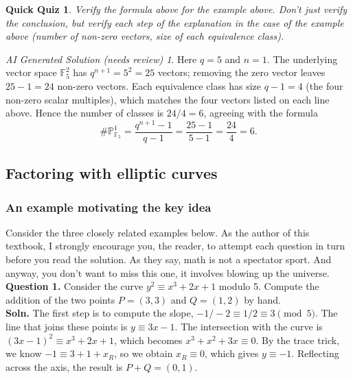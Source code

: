 \documentclass{article}
\theoremstyle{plain}
\newtheorem{quiz}[theorem]{Quick Quiz}
\theoremstyle{definition}
\theoremstyle{remark}
\newtheorem*{aisolution}{AI Generated Solution (needs review)}
\numberwithin{theorem}{section}
\newcommand{\FF}{\mathbb{F}}
\newcommand{\PP}{\mathbb{P}}
\begin{document}
\begin{quiz}
    Verify the formula above for the example above.  Don't just verify the conclusion, but verify each step of the explanation in the case of the example above (number of non-zero vectors, size of each equivalence class).
\end{quiz}
\begin{aisolution}
Here $q = 5$ and $n = 1$.  The underlying vector space $\FF_5^2$ has $q^{n+1} = 5^2 = 25$ vectors; removing the zero vector leaves $25 - 1 = 24$ non-zero vectors.  Each equivalence class has size $q - 1 = 4$ (the four non-zero scalar multiples), which matches the four vectors listed on each line above.  Hence the number of classes is $24/4 = 6$, agreeing with the formula
\[
\#\PP^1_{\FF_5} = \frac{q^{n+1}-1}{q-1} = \frac{25-1}{5-1} = \frac{24}{4} = 6.
\]
\end{aisolution}



\subsection{Factoring with elliptic curves}

\subsubsection{An example motivating the key idea}

Consider the three closely related examples below.  As the author of this textbook, I strongly encourage you, the reader, to attempt each question in turn before you read the solution.  As they say, math is not a spectator sport.  And anyway, you don't want to miss this one, it involves blowing up the universe.\\

\textbf{Question 1.}  Consider the curve $y^2 \equiv x^3 +2x + 1$ modulo 5.  Compute the addition of the two points $P = (3,3)$ and $Q = (1,2)$ by hand.  \\

\textbf{Soln.} The first step is to compute the slope, $-1/-2 \equiv 1/2 \equiv 3 \pmod{5}$.  The line that joins these points is $y \equiv 3x - 1$.  The intersection with the curve is $(3x-1)^2 \equiv x^3 + 2x + 1$, which becomes $x^3 + x^2 + 3x \equiv 0$.  By the trace trick, we know $-1 \equiv 3 + 1 + x_R$, so we obtain $x_R \equiv 0$, which gives $y \equiv -1$.  Reflecting across the axis, the result is $P+Q = (0,1)$.\\
\end{document}
